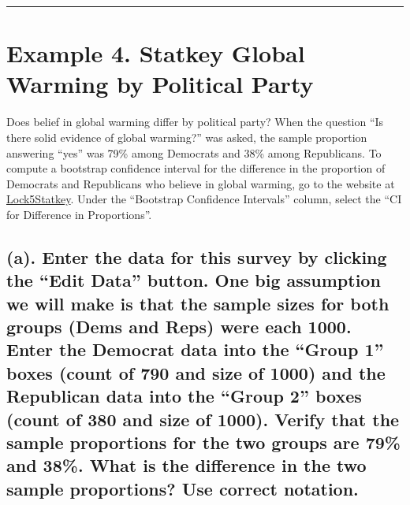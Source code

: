 \documentclass[
]{book}
\begin{document}
\begin{center}\rule{0.5\linewidth}{0.5pt}\end{center}

\hypertarget{example-4.-statkey-global-warming-by-political-party}{%
\section{Example 4. Statkey Global Warming by Political Party}\label{example-4.-statkey-global-warming-by-political-party}}

Does belief in global warming differ by political party? When the question ``Is there solid evidence of global warming?'' was asked, the sample proportion answering ``yes'' was 79\% among Democrats and 38\% among
Republicans. To compute a bootstrap confidence interval for the difference in the proportion of Democrats
and Republicans who believe in global warming, go to the website at \href{http://www.lock5stat.com/StatKey/}{Lock5Statkey}. Under the ``Bootstrap Confidence Intervals'' column, select the ``CI for Difference in Proportions''.

\hypertarget{a.-enter-the-data-for-this-survey-by-clicking-the-edit-data-button.-one-big-assumption-we-will-make-is-that-the-sample-sizes-for-both-groups-dems-and-reps-were-each-1000.-enter-the-democrat-data-into-the-group-1-boxes-count-of-790-and-size-of-1000-and-the-republican-data-into-the-group-2-boxes-count-of-380-and-size-of-1000.-verify-that-the-sample-proportions-for-the-two-groups-are-79-and-38.-what-is-the-difference-in-the-two-sample-proportions-use-correct-notation.}{%
\subsection{(a). Enter the data for this survey by clicking the ``Edit Data'' button. One big assumption we will make is that the sample sizes for both groups (Dems and Reps) were each 1000. Enter the Democrat data into the ``Group 1'' boxes (count of 790 and size of 1000) and the Republican data into the ``Group 2'' boxes (count of 380 and size of 1000). Verify that the sample proportions for the two groups are 79\% and 38\%. What is the difference in the two sample proportions? Use correct notation.}\label{a.-enter-the-data-for-this-survey-by-clicking-the-edit-data-button.-one-big-assumption-we-will-make-is-that-the-sample-sizes-for-both-groups-dems-and-reps-were-each-1000.-enter-the-democrat-data-into-the-group-1-boxes-count-of-790-and-size-of-1000-and-the-republican-data-into-the-group-2-boxes-count-of-380-and-size-of-1000.-verify-that-the-sample-proportions-for-the-two-groups-are-79-and-38.-what-is-the-difference-in-the-two-sample-proportions-use-correct-notation.}}
\end{document}
